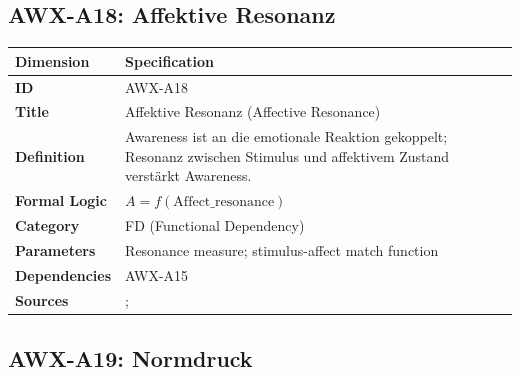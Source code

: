 
\subsection{AWX-A18: Affektive Resonanz}

\begin{table}[htbp]
\small
\begin{tabular}{p{3cm}p{11cm}}
\toprule
\textbf{Dimension} & \textbf{Specification} \\
\midrule
\textbf{ID} & AWX-A18 \\
\textbf{Title} & Affektive Resonanz (Affective Resonance) \\
\textbf{Definition} & Awareness ist an die emotionale Reaktion gekoppelt; Resonanz zwischen Stimulus und affektivem Zustand verstärkt Awareness. \\
\textbf{Formal Logic} & $A = f(\text{Affect\_resonance})$ \\
\textbf{Category} & FD (Functional Dependency) \\
\textbf{Parameters} & Resonance measure; stimulus-affect match function \\
\textbf{Dependencies} & AWX-A15 \\
\textbf{Sources} & \citet{zajonc1980feeling}; \citet{loewenstein2001risk} \\
\bottomrule
\end{tabular}
\end{table}


\subsection{AWX-A19: Normdruck}

